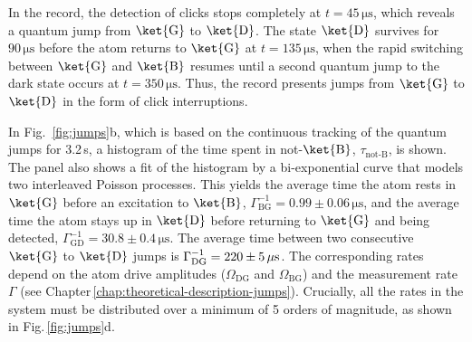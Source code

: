 In the record, the detection of clicks stops completely at $t=45\,\mathrm{\mu s}$,
which reveals a quantum jump from $\ket{\mathrm{G}}$ to $\ket{\mathrm{D}}$.
The state $\ket{\mathrm{D}}$ survives for $90\,\mathrm{\mu s}$ before
the atom returns to $\ket{\mathrm{G}}$ at $t=135\,\mathrm{\mu s}$,
when the rapid switching between $\ket{\mathrm{G}}$ and $\ket{\mathrm{B}}$
resumes until a second quantum jump to the dark state occurs at $t=350\,\mathrm{\mu s}$.
Thus, the record presents jumps from $\ket{\mathrm{G}}$ to $\ket{\mathrm{D}}$
in the form of click interruptions.

In Fig.~\ref{fig:jumps}b, which is based on the continuous tracking
of the quantum jumps for 3.2\,s, a histogram of the time spent in
not-$\ket{\mathrm{B}}$, $\tau_{\operatorname{not-B}}$, is shown.
The panel also shows a fit of the histogram by a bi-exponential curve
that models two interleaved Poisson processes. This yields the average
time the atom rests in $\ket{\mathrm{G}}$ before an excitation to
$\ket{\mathrm{B}}$, $\Gamma_{\mathrm{BG}}^{-1}=0.99\pm0.06\,\mathrm{\mu s}$,
and the average time the atom stays up in $\ket{\mathrm{D}}$ before
returning to $\ket{\mathrm{G}}$ and being detected, $\Gamma_{\mathrm{GD}}^{-1}=30.8\pm0.4\,\mathrm{\mu s}$.
The average time between two consecutive $\ket{\mathrm{G}}$ to $\ket{\mathrm{D}}$
jumps is $\Gamma_{\mathrm{DG}}^{-1}=220\pm5\thinspace\mathrm{\mu s}$.
The corresponding rates depend on the atom drive amplitudes ($\Omega_{\mathrm{DG}}$
and $\Omega_{\mathrm{BG}}$) and the measurement rate $\Gamma$ (see
Chapter\,\ref{chap:theoretical-description-jumps}). Crucially, all
the rates in the system must be distributed over a minimum of 5 orders
of magnitude, as shown in Fig.\,\ref{fig:jumps}d. 

